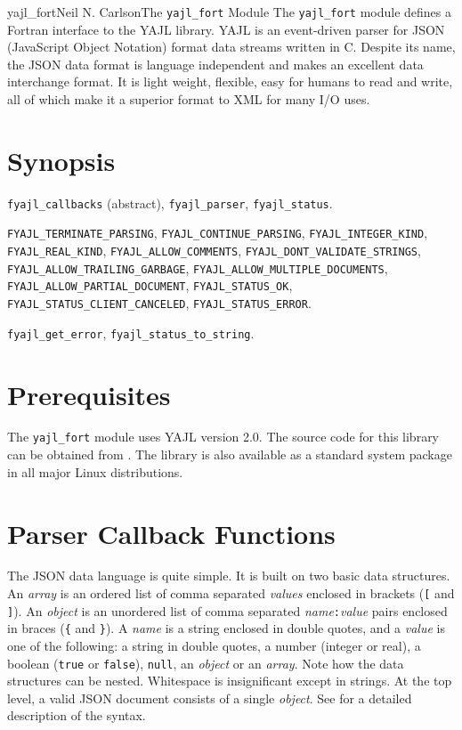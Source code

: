 \documentclass[11pt]{article}
\begin{document}

\begin{Name}{3}{yajl_fort}{Neil N. Carlson}{}{The \texttt{yajl_fort} Module}
The \texttt{yajl_fort} module defines a Fortran interface to the YAJL library.
YAJL is an event-driven parser for JSON (JavaScript Object Notation) format
data streams written in C.  Despite its name, the JSON data format is language
independent and makes an excellent data interchange format. It is light weight,
flexible, easy for humans to read and write, all of which make it a superior
format to XML for many I/O uses.
\end{Name}

\section{Synopsis}
\begin{description}[style=nextline]\raggedright
\item[Derived Types]
  \texttt{fyajl_callbacks} (abstract),
  \texttt{fyajl_parser},
  \texttt{fyajl_status}.
\item[Parameters]
  \texttt{FYAJL_TERMINATE_PARSING},
  \texttt{FYAJL_CONTINUE_PARSING},
  \texttt{FYAJL_INTEGER_KIND},
  \texttt{FYAJL_REAL_KIND},
  \texttt{FYAJL_ALLOW_COMMENTS},
  \texttt{FYAJL_DONT_VALIDATE_STRINGS},
  \texttt{FYAJL_ALLOW_TRAILING_GARBAGE},
  \texttt{FYAJL_ALLOW_MULTIPLE_DOCUMENTS},
  \texttt{FYAJL_ALLOW_PARTIAL_DOCUMENT},
  \texttt{FYAJL_STATUS_OK},
  \texttt{FYAJL_STATUS_CLIENT_CANCELED},
  \texttt{FYAJL_STATUS_ERROR}.
\item[Procedures]
  \texttt{fyajl_get_error},
  \texttt{fyajl_status_to_string}.
\end{description}

\section{Prerequisites}
The \texttt{yajl_fort} module uses YAJL version 2.0.  The source code
for this library can be obtained from .
The library is also available as a standard system package in all major
Linux distributions.

\section{Parser Callback Functions}
The JSON data language is quite simple.  It is built on two basic data
structures.  An \emph{array} is an ordered list of comma separated
\emph{values} enclosed in brackets (\texttt{[} and \texttt{]}).
An \emph{object} is an unordered list of comma separated
\emph{name}\texttt{:}\emph{value} pairs enclosed in braces (\texttt{\{}
and \texttt{\}}).  A \emph{name} is a string enclosed in double quotes,
and a \emph{value} is one of the following: a string in double quotes,
a number (integer or real), a boolean (\texttt{true} or
\texttt{false}), \texttt{null}, an \emph{object} or an \emph{array}.
Note how the data structures can be nested.
Whitespace is insignificant except in strings.
At the top level, a valid JSON document consists of a single \emph{object}.
See  for a detailed description of the syntax.
\end{document}
